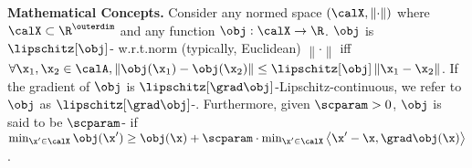 \textbf{Mathematical Concepts. } 
Consider any normed space $(\calX, \left\| \cdot \right\|)$ where $\calX \subset \R^\outerdim$ and any function $\obj: \calX \to \R$.
$\obj$ is $\lipschitz[\obj]$- w.r.t.\@ norm (typically, Euclidean)
$\left\| \cdot \right\|$ iff $\forall \x_1, \x_2 \in \calA, \left\| \obj(\x_1) - \obj(\x_2) \right\| \leq \lipschitz[\obj] \left\| \x_1 - \x_2 \right\|$.
If the gradient of $\obj$ is $\lipschitz[\grad \obj]$-Lipschitz-continuous, we refer to $\obj$ as $\lipschitz[\grad \obj]$-.
Furthermore, given $\scparam > 0$,  $\obj$ is said to be $\scparam$- if $\min_{\x^\prime \in \calX} \obj(\x^\prime) \geq \obj(\x) + \scparam \cdot \min_{\x^\prime \in \calX} \left< \x^\prime - \x, \grad \obj(\x) \right>$ \citep{bhandari2019global}.









